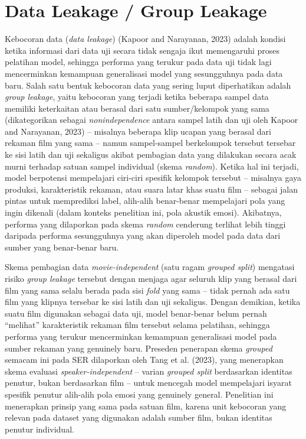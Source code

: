 \section{Data Leakage / Group Leakage}
\label{sec:2.3}

Kebocoran data (\emph{data leakage}) (Kapoor and Narayanan, 2023) adalah
kondisi ketika informasi dari data uji secara tidak sengaja ikut
memengaruhi proses pelatihan model, sehingga performa yang terukur pada
data uji tidak lagi mencerminkan kemampuan generalisasi model yang
sesungguhnya pada data baru. Salah satu bentuk kebocoran data yang
sering luput diperhatikan adalah \emph{group leakage}, yaitu kebocoran
yang terjadi ketika beberapa sampel data memiliki keterkaitan atau
berasal dari satu sumber/kelompok yang sama (dikategorikan sebagai
\emph{nonindependence} antara sampel latih dan uji oleh Kapoor and
Narayanan, 2023) -- misalnya beberapa klip ucapan yang berasal dari
rekaman film yang sama -- namun sampel-sampel berkelompok tersebut
tersebar ke sisi latih dan uji sekaligus akibat pembagian data yang
dilakukan secara acak murni terhadap satuan sampel individual (skema
\emph{random}). Ketika hal ini terjadi, model berpotensi mempelajari
ciri-ciri spesifik kelompok tersebut -- misalnya gaya produksi,
karakteristik rekaman, atau suara latar khas suatu film -- sebagai
jalan pintas untuk memprediksi label, alih-alih benar-benar mempelajari
pola yang ingin dikenali (dalam konteks penelitian ini, pola akustik
emosi). Akibatnya, performa yang dilaporkan pada skema \emph{random}
cenderung terlihat lebih tinggi daripada performa sesungguhnya yang
akan diperoleh model pada data dari sumber yang benar-benar baru.

Skema pembagian data \emph{movie-independent} (satu ragam
\emph{grouped split}) mengatasi risiko \emph{group leakage} tersebut
dengan menjaga agar seluruh klip yang berasal dari film yang sama
selalu berada pada sisi \emph{fold} yang sama -- tidak pernah ada satu
film yang klipnya tersebar ke sisi latih dan uji sekaligus. Dengan
demikian, ketika suatu film digunakan sebagai data uji, model
benar-benar belum pernah ``melihat'' karakteristik rekaman film
tersebut selama pelatihan, sehingga performa yang terukur mencerminkan
kemampuan generalisasi model pada sumber rekaman yang genuinely baru.
Preseden penerapan skema \emph{grouped} semacam ini pada SER dilaporkan
oleh Tang et al. (2023), yang menerapkan skema evaluasi
\emph{speaker-independent} -- varian \emph{grouped split} berdasarkan
identitas penutur, bukan berdasarkan film -- untuk mencegah model
mempelajari isyarat spesifik penutur alih-alih pola emosi yang
genuinely general. Penelitian ini menerapkan prinsip yang sama pada
satuan film, karena unit kebocoran yang relevan pada dataset yang
digunakan adalah sumber film, bukan identitas penutur individual.


